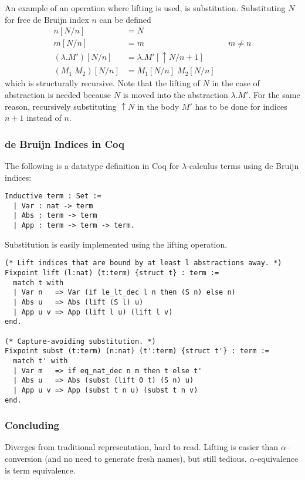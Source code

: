 \documentclass[a4paper,11pt]{article}
\begin{document}
An example of an operation where lifting is used, is substitution.
Substituting $N$ for free de Bruijn index $n$ can be defined
\begin{align*}
  n[N/n]             &= N\\
  m[N/n]             &= m                    && \text{$m \neq n$} \\
  (\lambda .M')[N/n] &= \lambda .M'[\uparrow \! N / n\!+\!1]\\
  (M_1 \; M_2)[N/n]  &= M_1[N/n] \; M_2[N/n]
\end{align*}
which is structurally recursive.
Note that the lifting of $N$ in the case of abstraction is needed because
$N$ is moved into the abstraction $\lambda.M'$.
For the same reason, recursively substituting $\uparrow \! N$ in the body
$M'$ has to be done for indices $n+1$ instead of $n$.

\subsubsection*{de Bruijn Indices in Coq}

The following is a datatype definition in Coq for $\lambda$-calculus
terms using de Bruijn indices:
\begin{lstlisting}
Inductive term : Set :=
  | Var : nat -> term
  | Abs : term -> term
  | App : term -> term -> term.
\end{lstlisting}
Substitution is easily implemented using the lifting operation.
\begin{lstlisting}
(* Lift indices that are bound by at least l abstractions away. *)
Fixpoint lift (l:nat) (t:term) {struct t} : term :=
  match t with
  | Var n   => Var (if le_lt_dec l n then (S n) else n)
  | Abs u   => Abs (lift (S l) u)
  | App u v => App (lift l u) (lift l v)
end.

(* Capture-avoiding substitution. *)
Fixpoint subst (t:term) (n:nat) (t':term) {struct t'} : term :=
  match t' with
  | Var m   => if eq_nat_dec n m then t else t'
  | Abs u   => Abs (subst (lift 0 t) (S n) u)
  | App u v => App (subst t n u) (subst t n v)
end.
\end{lstlisting}

\subsubsection*{Concluding} %

Diverges from traditional representation, hard to read.
Lifting is easier than $\alpha$--conversion (and no need to generate
fresh names), but still tedious.
$\alpha$-equivalence is term equivalence.
\end{document}
